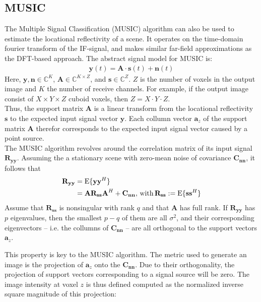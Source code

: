 \subsection{MUSIC}
The Multiple Signal Classification (MUSIC) algorithm can also be used to estimate the locational reflectivity of a scene.
It operates on the time-domain fourier transform of the IF-signal, and makes similar far-field approximations as the DFT-based approach.
The abstract signal model for MUSIC is:
\begin{align}
    \mathbf y(t) = \mathbf A \cdot \mathbf s(t) + \mathbf n(t)
\end{align}
Here, $\mathbf y,\mathbf n \in \mathbb{C}^{K}$,
$\mathbf A \in \mathbb{C}^{K \times Z}$, and
$\mathbf s \in \mathbb{C}^{Z}$.
$Z$ is the number of voxels in the output image and $K$ the number of receive channels.
For example, if the output image consist of $X \times Y \times Z$ cuboid voxels, then $Z=X\cdot Y\cdot Z$. \\
Thus, the support matrix $\mathbf A$ is a linear transform from the locational reflectivity $\mathbf{s}$
to the expected input signal vector $\mathbf{y}$.
Each collumn vector $\mathbf a_z$ of the support matrix $\mathbf A$ therefor corresponds to the expected input signal vector caused by a point source. \\

The MUSIC algorithm revolves around the correlation matrix of its input signal $\mathbf{R_{yy}}$.
Assuming the a stationary scene with zero-mean noise of covariance $\mathbf{C_{nn}}$,
it follows that
\begin{align}
    \mathbf{R_{yy}} & = \text{E}\{\mathbf{yy}^H\}             \\
                    & =\mathbf{AR_{ss}A}^H + \mathbf{C_{nn}},
    \text{\,with\,} \mathbf{R_{ss}} := \text{E}\{\mathbf{ss}^H\}
\end{align}
Assume that $\mathbf{R_{ss}}$ is nonsingular with rank $q$ and that $\mathbf{A}$ has full rank.
If $\mathbf{R_{yy}}$ has $p$ eigenvalues, then the smallest $p-q$ of them are all $\sigma^2$,
and their corresponding eigenvectors -- i.e. the collumns of $\mathbf{C_{nn}}$ -- are all orthogonal to the support vectors $\mathbf a_z$.

This property is key to the MUSIC algorithm.
The metric used to generate an image is the projection of $\mathbf a_z$ onto the $\mathbf{C_{nn}}$.
Due to their orthogonality, the projection of support vectors corresponding to a signal source will be zero.
The image intensity at voxel $z$ is thus defined computed as the normalized inverse square magnitude of this projection:

